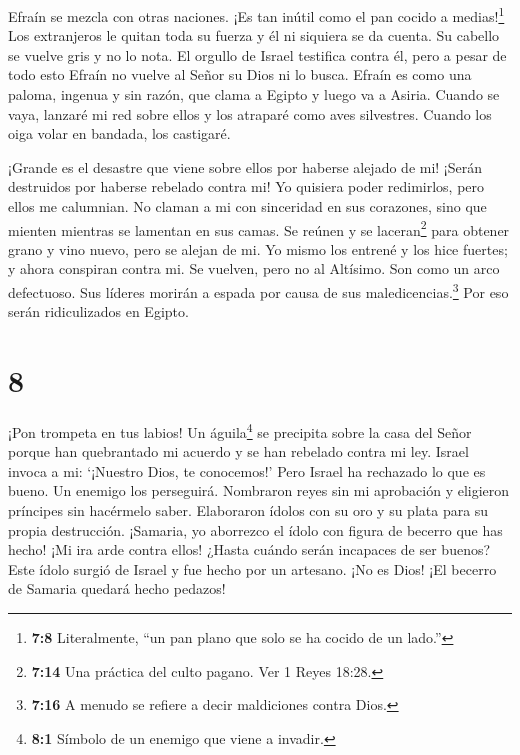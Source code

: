 Efraín se mezcla con otras naciones. ¡Es tan inútil como el
pan cocido a medias!\footnote{\textbf{7:8} Literalmente, ``un pan plano
  que solo se ha cocido de un lado.''}  Los extranjeros le
quitan toda su fuerza y él ni siquiera se da cuenta. Su cabello se
vuelve gris y no lo nota.  El orgullo de Israel testifica
contra él, pero a pesar de todo esto Efraín no vuelve al Señor su Dios
ni lo busca.  Efraín es como una paloma, ingenua y sin
razón, que clama a Egipto y luego va a Asiria.  Cuando se
vaya, lanzaré mi red sobre ellos y los atraparé como aves silvestres.
Cuando los oiga volar en bandada, los castigaré.

 ¡Grande es el desastre que viene sobre ellos por haberse
alejado de mi! ¡Serán destruidos por haberse rebelado contra mi! Yo
quisiera poder redimirlos, pero ellos me calumnian.  No
claman a mi con sinceridad en sus corazones, sino que mienten mientras
se lamentan en sus camas. Se reúnen y se laceran\footnote{\textbf{7:14}
  Una práctica del culto pagano. Ver 1 Reyes 18:28.} para obtener grano
y vino nuevo, pero se alejan de mi.  Yo mismo los entrené y
los hice fuertes; y ahora conspiran contra mi.  Se vuelven,
pero no al Altísimo. Son como un arco defectuoso. Sus líderes morirán a
espada por causa de sus maledicencias.\footnote{\textbf{7:16} A menudo
  se refiere a decir maldiciones contra Dios.} Por eso serán
ridiculizados en Egipto.

\hypertarget{section-7}{%
\section{8}\label{section-7}}

 ¡Pon trompeta en tus labios! Un águila\footnote{\textbf{8:1}
  Símbolo de un enemigo que viene a invadir.} se precipita sobre la casa
del Señor porque han quebrantado mi acuerdo y se han rebelado contra mi
ley.  Israel invoca a mi: `¡Nuestro Dios, te conocemos!'
 Pero Israel ha rechazado lo que es bueno. Un enemigo los
perseguirá.  Nombraron reyes sin mi aprobación y eligieron
príncipes sin hacérmelo saber. Elaboraron ídolos con su oro y su plata
para su propia destrucción.  ¡Samaria, yo aborrezco el ídolo
con figura de becerro que has hecho! ¡Mi ira arde contra ellos! ¿Hasta
cuándo serán incapaces de ser buenos?  Este ídolo surgió de
Israel y fue hecho por un artesano. ¡No es Dios! ¡El becerro de Samaria
quedará hecho pedazos!

